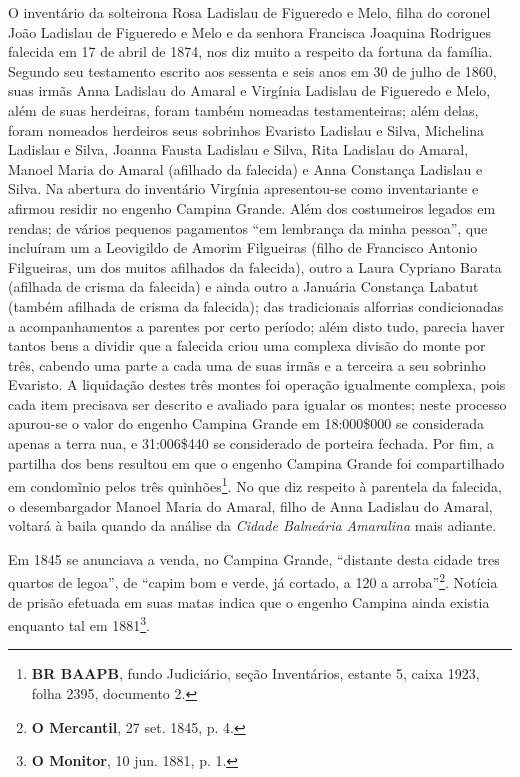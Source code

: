 \begin{citacao}
O inventário da solteirona Rosa Ladislau de Figueredo e Melo, filha do coronel João Ladislau de Figueredo e Melo e da senhora Francisca Joaquina Rodrigues falecida em 17 de abril de 1874, nos diz muito a respeito da fortuna da família. Segundo seu testamento escrito aos sessenta e seis anos em 30 de julho de 1860, suas irmãs Anna Ladislau do Amaral e Virgínia Ladislau de Figueredo e Melo, além de suas herdeiras, foram também nomeadas testamenteiras; além delas, foram nomeados herdeiros seus sobrinhos Evaristo Ladislau e Silva, Michelina Ladislau e Silva, Joanna Fausta Ladislau e Silva, Rita Ladislau do Amaral, Manoel Maria do Amaral (afilhado da falecida) e Anna Constança Ladislau e Silva. Na abertura do inventário Virgínia apresentou-se como inventariante e afirmou residir no engenho Campina Grande. Além dos costumeiros legados em rendas; de vários pequenos pagamentos ``em lembrança da minha pessoa'', que incluíram um a Leovigildo de Amorim Filgueiras (filho de Francisco Antonio Filgueiras, um dos muitos afilhados da falecida), outro a Laura Cypriano Barata (afilhada de crisma da falecida) e ainda outro a Januária Constança Labatut (também afilhada de crisma da falecida); das tradicionais alforrias condicionadas a acompanhamentos a parentes por certo período; além disto tudo, parecia haver tantos bens a dividir que a falecida criou uma complexa divisão do monte por três, cabendo uma parte a cada uma de suas irmãs e a terceira a seu sobrinho Evaristo. A liquidação destes três montes foi operação igualmente complexa, pois cada item precisava ser descrito e avaliado para igualar os montes; neste processo apurou-se o valor do engenho Campina Grande em 18:000\$000 se considerada apenas a terra nua, e 31:006\$440 se considerado de porteira fechada. Por fim, a partilha dos bens resultou em que o engenho Campina Grande foi compartilhado em condomĩnio pelos três quinhões\footnote{\textbf{BR BAAPB}, fundo Judiciário, seção Inventários, estante 5, caixa 1923, folha 2395, documento 2.}. No que diz respeito à parentela da falecida, o desembargador Manoel Maria do Amaral, filho de Anna Ladislau do Amaral, voltará à baila quando da análise da \textit{Cidade Balneária Amaralina} mais adiante.

Em 1845 se anunciava a venda, no Campina Grande, ``distante desta cidade tres quartos de legoa'', de ``capim bom e verde, já cortado, a 120 a arroba''\footnote{\textbf{O Mercantil}, 27 set. 1845, p. 4.}. Notícia de prisão efetuada em suas matas indica que o engenho Campina ainda existia enquanto tal em 1881\footnote{\textbf{O Monitor}, 10 jun. 1881, p. 1.}.


\end{citacao}
